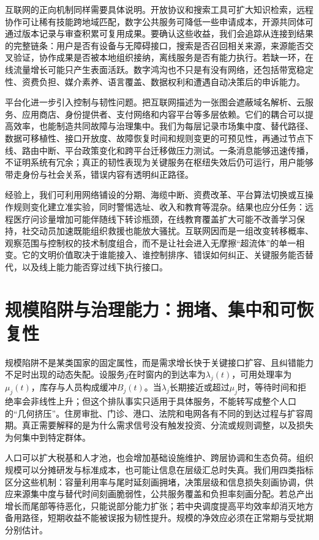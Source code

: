 互联网的正向机制同样需要具体说明。开放协议和搜索工具可扩大知识检索，远程协作可让稀有技能跨地域匹配，数字公共服务可降低一些申请成本，开源共同体可通过版本记录与审查积累可复用成果。要确认这些收益，我们会追踪从连接到结果的完整链条：用户是否有设备与无障碍接口，搜索是否召回相关来源，来源能否交叉验证，协作成果是否被本地组织接纳，离线服务是否有能力执行。若缺一环，在线流量增长可能只产生表面活跃。数字鸿沟也不只是有没有网络，还包括带宽稳定性、资费负担、媒介素养、语言覆盖、数据权利和遭遇自动决策后的申诉能力。

平台化进一步引入控制与韧性问题。把互联网描述为一张图会遮蔽域名解析、云服务、应用商店、身份提供者、支付网络和内容平台等多层依赖。它们的耦合可以提高效率，也能制造共同故障与治理集中。我们为每层记录市场集中度、替代路径、数据可移植性、接口开放度、故障恢复时间和规则变更的可预见性，再通过节点下线、路由中断、平台政策变化和跨平台迁移做压力测试。一条消息能够迅速传播，不证明系统有冗余；真正的韧性表现为关键服务在枢纽失效后仍可运行，用户能够带走身份与社会关系，错误内容有透明纠正路径。

经验上，我们可利用网络铺设的分期、海缆中断、资费改革、平台算法切换或互操作规则变化建立准实验，同时警惕选址、收入和教育等混杂。结果也应分任务：远程医疗问诊量增加可能伴随线下转诊瓶颈，在线教育覆盖扩大可能不改善学习保持，社交动员加速既能组织救援也能放大骚扰。互联网因而是一组改变转移概率、观察范围与控制权的技术制度组合，而不是让社会进入无摩擦“超流体”的单一相变。它的文明价值取决于谁能接入、谁控制排序、错误如何纠正、关键服务能否替代，以及线上能力能否穿过线下执行接口。

\section{规模陷阱与治理能力：拥堵、集中和可恢复性}
\label{sec:great_power_thermodynamics}

规模陷阱不是某类国家的固定属性，而是需求增长快于关键接口扩容、且纠错能力不足时出现的动态失配。设服务$j$在时窗内的到达率为$\lambda_j(t)$，可用处理率为$\mu_j(t)$，库存与人员构成缓冲$B_j(t)$。当$\lambda_j$长期接近或超过$\mu_j$时，等待时间和拒绝率会非线性上升；但这个排队事实只适用于具体服务，不能转写成整个人口的“几何挤压”。住房审批、门诊、港口、法院和电网各有不同的到达过程与扩容周期。真正需要解释的是为什么需求信号没有触发投资、分流或规则调整，以及损失为何集中到特定群体。

人口可以扩大税基和人才池，也会增加基础设施维护、跨层协调和生态负荷。组织规模可以分摊研发与标准成本，也可能让信息在层级汇总时失真。我们用四类指标区分这些机制：容量利用率与尾时延刻画拥堵，决策层级和信息损失刻画协调，供应来源集中度与替代时间刻画脆弱性，公共服务覆盖和负担率刻画分配。若总产出增长而尾部等待恶化，只能说部分能力扩张；若中央调度提高平均效率却消灭地方备用路径，短期收益不能被误报为韧性提升。规模的净效应必须在正常期与受扰期分别估计。

